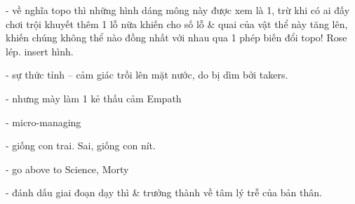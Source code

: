 \documentclass[12pt,oneside]{book}
\begin{document}
- về nghĩa topo thì những hình dáng mông này được xem là 1, trừ khi có ai đấy chơi trội khuyết thêm 1 lỗ nữa khiến cho số lỗ \& quai của vật thể này tăng lên, khiến chúng không thể nào đồng nhất với nhau qua 1 phép biến đổi topo! Rose lép. insert hình.

- sự thức tỉnh -- cảm giác trồi lên mặt nước, do bị dìm bởi takers.

- nhưng mày làm 1 kẻ thấu cảm Empath

- micro-managing

- giống con trai. Sai, giống con nít.

- go above to Science, Morty

- đánh dấu giai đoạn dạy thì \& trưởng thành về tâm lý trễ của bản thân.

\end{document}

